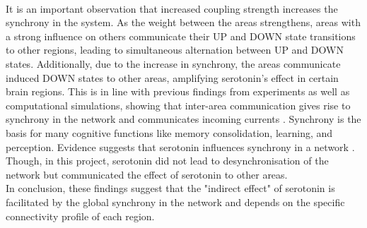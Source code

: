 \\
\indent It is an important observation that increased coupling strength increases the synchrony in the system. As the weight between the areas strengthens, areas with a strong influence on others communicate their UP and DOWN state transitions to other regions, leading to simultaneous alternation between UP and DOWN states. Additionally, due to the increase in synchrony, the areas communicate induced DOWN states to other areas, amplifying serotonin's effect in certain brain regions. This is in line with previous findings from experiments as well as computational simulations, showing that inter-area communication gives rise to synchrony in the network and communicates incoming currents \cite{varelaBrainwebPhaseSynchronization2001, roelfsema1997visuomotor}. Synchrony is the basis for many cognitive functions like memory consolidation, learning, and perception. Evidence suggests that serotonin influences synchrony in a network \cite{puigSerotoninModulationPrefrontoHippocampal2015}. Though, in this project, serotonin did not lead to desynchronisation of the network but communicated the effect of serotonin to other areas. 
\\
\indent In conclusion, these findings suggest that the "indirect effect" of serotonin is facilitated by the global synchrony in the network and depends on the specific connectivity profile of each region.

